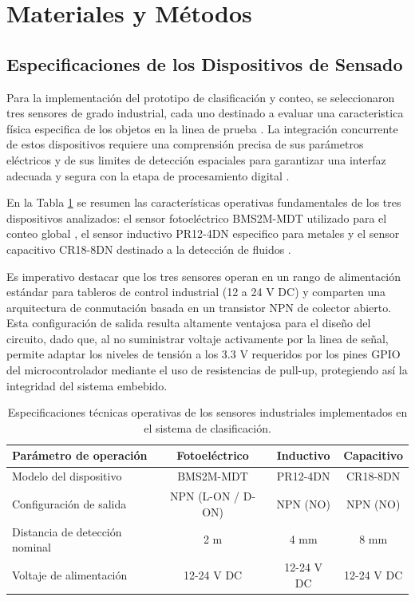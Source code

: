 \documentclass[conference]{IEEEtran}
\begin{document}
\section{Materiales y Métodos}

\subsection{Especificaciones de los Dispositivos de Sensado}

Para la implementación del prototipo de clasificación y conteo, se seleccionaron tres sensores de grado industrial, cada uno destinado a evaluar una caracteristica física especifica de los objetos en la linea de prueba \cite{sensores_3}. La integración concurrente de estos dispositivos requiere una comprensión precisa de sus parámetros eléctricos y de sus limites de detección espaciales para garantizar una interfaz adecuada y segura con la etapa de procesamiento digital \cite{sensores_14}. 

En la Tabla \ref{tab:especificaciones_sensores} se resumen las características operativas fundamentales de los tres dispositivos analizados: el sensor fotoeléctrico  BMS2M-MDT utilizado para el conteo global \cite{sensores_11}, el sensor inductivo PR12-4DN especifico para metales \cite{sensores_5} y el sensor capacitivo CR18-8DN destinado a la detección de fluidos \cite{sensores_16}. 

Es imperativo destacar que los tres sensores operan en un rango de alimentación estándar para tableros de control industrial (12 a 24 V DC) y comparten una arquitectura de conmutación basada en un transistor NPN de colector abierto. Esta configuración de salida resulta altamente ventajosa para el diseño del circuito, dado que, al no suministrar voltaje activamente por la linea de señal, permite adaptar los niveles de tensión a los 3.3 V requeridos por los pines GPIO del microcontrolador mediante el uso de resistencias de pull-up, protegiendo así la integridad del sistema embebido.

\begin{table}[htbp]
    \centering
    \caption{Especificaciones técnicas operativas de los sensores industriales implementados en el sistema de clasificación.}
    \label{tab:especificaciones_sensores}
    \begin{tabular}{lccc}
        \hline
        Parámetro de operación & Fotoeléctrico & Inductivo & Capacitivo \\
        \hline
        Modelo del dispositivo &  BMS2M-MDT & PR12-4DN & CR18-8DN \\
        Configuración de salida & NPN (L-ON / D-ON) & NPN (NO) & NPN (NO) \\
        Distancia de detección nominal & 2 m & 4 mm & 8 mm \\
        Voltaje de alimentación & 12-24 V DC & 12-24 V DC & 12-24 V DC \\
        \hline
    \end{tabular}
\end{table}
\end{document}
